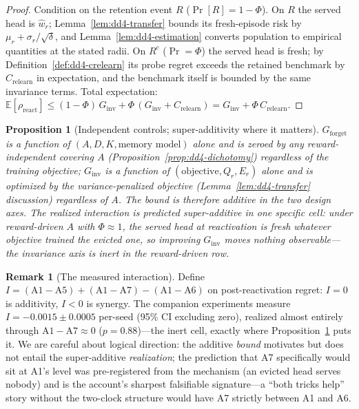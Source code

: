 \documentclass[11pt,a4paper]{article}
\theoremstyle{definition}
\newtheorem{remark}{Remark}[section]
\theoremstyle{plain}
\newtheorem{proposition}{Proposition}[section]
\newcommand{\E}{\mathbb{E}}
\newcommand{\Ginv}{G_{\mathrm{inv}}}
\newcommand{\Gforget}{G_{\mathrm{forget}}}
\begin{document}
\begin{proof}
Condition on the retention event $R$ ($\Pr[R] = 1 - \Phi$). On $R$ the
served head is $\hat w_r$; Lemma~\ref{lem:dd4-transfer} bounds its
fresh-episode risk by $\mu_r + \sigma_r/\sqrt\delta$, and
Lemma~\ref{lem:dd4-estimation} converts population to empirical
quantities at the stated radii. On $R^c$ ($\Pr = \Phi$) the served head
is fresh; by Definition~\ref{def:dd4-crelearn} its probe regret exceeds
the retained benchmark by $C_{\mathrm{relearn}}$ in expectation, and the
benchmark itself is bounded by the same invariance terms. Total
expectation: $\E[\rho_{\mathrm{react}}] \le (1-\Phi)\,\Ginv + \Phi\,
(\Ginv + C_{\mathrm{relearn}}) = \Ginv + \Phi\, C_{\mathrm{relearn}}$.
\end{proof}

\begin{proposition}[Independent controls; super-additivity where it
matters]
\label{prop:dd4-additive}
$\Gforget$ is a function of $(A, D, K, \text{memory model})$ alone and
is zeroed by any reward-independent covering $A$
(Proposition~\ref{prop:dd4-dichotomy}) regardless of the training
objective; $\Ginv$ is a function of $(\text{objective}, Q_r, E_r)$ alone
and is optimized by the variance-penalized objective
(Lemma~\ref{lem:dd4-transfer} discussion) regardless of $A$. The
\emph{bound} is therefore additive in the two design axes. The
\emph{realized} interaction is predicted super-additive in one specific
cell: under reward-driven $A$ with $\Phi \approx 1$, the served head at
reactivation is fresh whatever objective trained the evicted one, so
improving $\Ginv$ moves nothing observable---the invariance axis is
inert in the reward-driven row.
\end{proposition}

\begin{remark}[The measured interaction]
Define $I = (\text{A1} - \text{A5}) + (\text{A1} - \text{A7}) -
(\text{A1} - \text{A6})$ on post-reactivation regret: $I = 0$ is
additivity, $I < 0$ is synergy. The companion experiments measure
$I = -0.0015 \pm 0.0005$ per-seed (95\% CI excluding zero), realized
almost entirely through $\text{A1} - \text{A7} \approx 0$
($p = 0.88$)---the inert cell, exactly where
Proposition~\ref{prop:dd4-additive} puts it. We are careful about
logical direction: the additive \emph{bound} motivates but does not
entail the super-additive \emph{realization}; the prediction that A7
specifically would sit at A1's level was pre-registered from the
mechanism (an evicted head serves nobody) and is the account's sharpest
falsifiable signature---a ``both tricks help'' story without the
two-clock structure would have A7 strictly between A1 and A6.
\end{remark}
\end{document}
